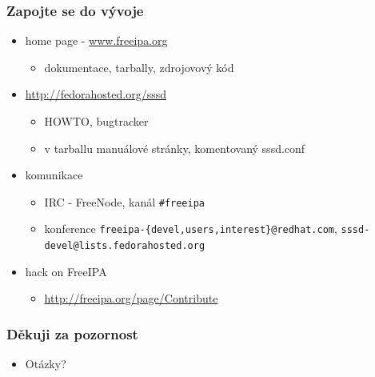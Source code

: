 \documentclass[pdftex,unicode,xcolor=table]{beamer}
\begin{document}
\begin{frame}
    \frametitle{Zapojte se do vývoje}
    \begin{itemize}
    \item home page - \url{www.freeipa.org}
        \begin{itemize}
        \item dokumentace, tarbally, zdrojovový kód
        \end{itemize}
    \item \url{http://fedorahosted.org/sssd}
        \begin{itemize}
            \item HOWTO, bugtracker
            \item v tarballu manuálové stránky, komentovaný sssd.conf
        \end{itemize}
    \item komunikace
        \begin{itemize}
        \item IRC - FreeNode, kanál \texttt{\#freeipa}
        \item konference \texttt{freeipa-\{devel,users,interest\}@redhat.com},
                         \texttt{sssd-devel@lists.fedorahosted.org}
        \end{itemize}
    \item hack on FreeIPA
        \begin{itemize}
        \item \url{http://freeipa.org/page/Contribute}
        \end{itemize}
    \end{itemize}
\end{frame}

\begin{frame}
    \frametitle{Děkuji za pozornost}
    \begin{itemize}
        \item Otázky?
    \end{itemize}
\end{frame}
\end{document}
